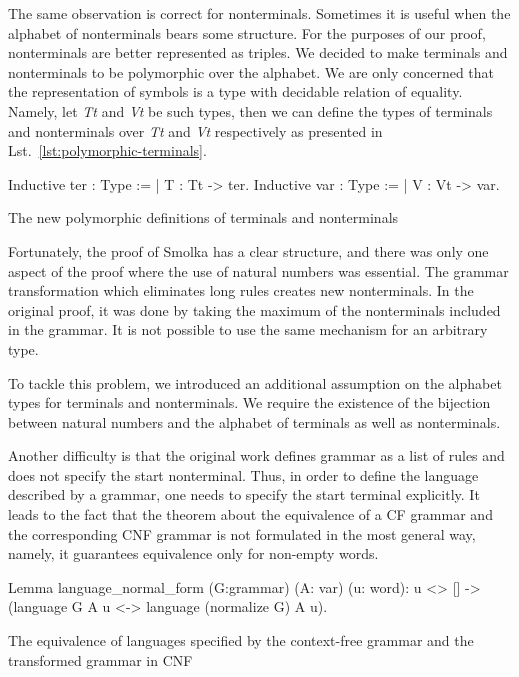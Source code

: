 The same observation is correct for nonterminals. 
Sometimes it is useful when the alphabet of nonterminals bears some structure. 
For the purposes of our proof, nonterminals are better represented as triples. 
We decided to make terminals and nonterminals to be polymorphic over the alphabet.
We are only concerned that the representation of symbols is a type with decidable relation of equality. 
Namely, let \textit{Tt} and \textit{Vt} be such types, then we can define the types of terminals and nonterminals over \textit{Tt} and \textit{Vt} respectively as presented in Lst.~\ref{lst:polymorphic-terminals}.

\begin{listing}[h]
    \begin{pyglist}[language=coq, numbers=none, numbersep=5pt]
  Inductive ter : Type := | T : Tt -> ter.
  Inductive var : Type := | V : Vt -> var.
    \end{pyglist}
    \caption{The new polymorphic definitions of terminals and nonterminals}
    \label{lst:polymorphic-terminals}
\end{listing}

Fortunately, the proof of Smolka has a clear structure, and there was only one aspect of the proof where the use of natural numbers was essential. The grammar transformation which eliminates long rules creates new nonterminals. In the original proof, it was done by taking the maximum of the nonterminals included in the grammar. 
It is not possible to use the same mechanism for an arbitrary type. 

To tackle this problem, we introduced an additional assumption on the alphabet types for terminals and nonterminals. We require the existence of the bijection between natural numbers and the alphabet of terminals as well as nonterminals.

Another difficulty is that the original work defines grammar as a list of rules and does not specify the start nonterminal. Thus, in order to define the language described by a  grammar, one needs to specify the start terminal explicitly. It leads to the fact that the theorem about the equivalence of a CF grammar and the corresponding CNF grammar is not formulated in the most general way, namely, it guarantees equivalence only for non-empty words. 

\begin{listing}[h]
    \begin{pyglist}[language=coq, numbers=none, numbersep=5pt]
  Lemma language_normal_form 
      (G:grammar) (A: var) (u: word):
    u <> [] -> 
    (language G A u <-> 
       language (normalize G) A u).
    \end{pyglist}
    \caption{The equivalence of languages specified by the context-free grammar and the transformed grammar in CNF}
    \label{lst:verbments1}
\end{listing}

